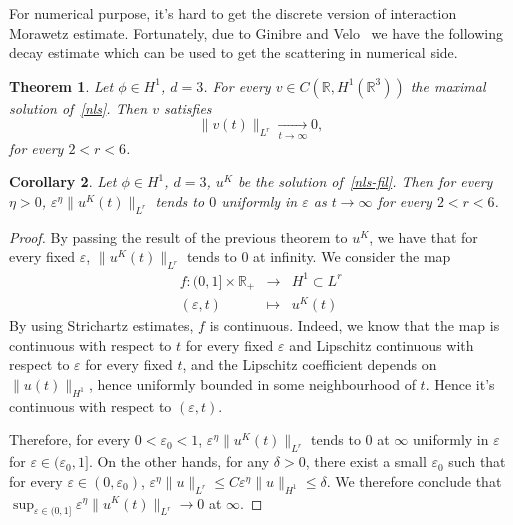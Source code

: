 \documentclass[10pt,a4paper]{article}
\newtheorem{theorem}{Theorem}[section]
\newtheorem{corollary}[theorem]{Corollary}
\begin{document}
  For numerical purpose, it's hard to get the discrete version of
  interaction Morawetz estimate. Fortunately, due to Ginibre and
  Velo~\cite{GiVl85b} we have the following decay estimate which can be used to
  get the scattering in numerical side. 
  \begin{theorem}
    Let \(\phi \in H^1\), \( d = 3 \). For every \(v\in C(\mathbb R,H^1(\mathbb
    R^3))\) the maximal solution of~\eqref{nls}. Then \(v\) satisfies 
    \[ \|v(t)\|_{L^r} \underset{t \to \infty}{\longrightarrow} 0, \]
    for every \(2 < r < 6\).
  \end{theorem}

  \begin{corollary}\label{cordecayestimate}
    Let \(\phi \in H^1\), \( d = 3 \), \(u^K\) be the solution of~\eqref{nls-fil}.
    Then for every \(\eta>0\), \(\varepsilon^\eta \|u^K(t)\|_{L^r}\) tends to \(0\) uniformly in
    \(\varepsilon\) as \(t \to \infty \) for every \( 2 < r < 6\). 
  \end{corollary}

  \begin{proof}
    By passing the result of the previous theorem to \(u^K\), we have that for every fixed \(\varepsilon\),
    \(\|u^K(t)\|_{L^r}\) tends to \(0\) at infinity. We consider the map 
    \[
    \begin{array}{rcl}
      f: (0,1] \times \mathbb R_+ &\rightarrow& H^1 \subset L^r \\
    (\varepsilon,t) &\mapsto& u^K(t)
    \end{array}
    \]
    By using Strichartz estimates, \(f\) is continuous. Indeed, we know
    that the map is continuous with respect to \(t\) for every fixed \(\varepsilon\) 
    and Lipschitz continuous with respect to \(\varepsilon\) for every fixed \(t\), 
    and the Lipschitz coefficient depends on \(\|u(t)\|_{H^1}\), hence uniformly
    bounded in some neighbourhood of \(t\). Hence it's continuous with respect to \((\varepsilon,t)\).

    Therefore, for every \(0 < \varepsilon_0 < 1\), \(\varepsilon^\eta\|u^K(t)\|_{L^r}\) tends 
    to \(0\) at \(\infty\) uniformly in
    \(\varepsilon\) for \(\varepsilon \in (\varepsilon_0,1]\). On the other hands,
    for any \(\delta > 0\), there exist a small \(\varepsilon_0\) such that for
    every \(\varepsilon \in (0,\varepsilon_0)\), \(\varepsilon^\eta \|u\|_{L^r}
    \leq C \varepsilon^\eta \|u\|_{H^1} \leq \delta\). We therefore conclude
    that \(\sup_{\varepsilon \in (0,1]} \varepsilon^\eta\|u^K(t)\|_{L^r} \to 0\) at \(\infty\).
  \end{proof}
\end{document}
